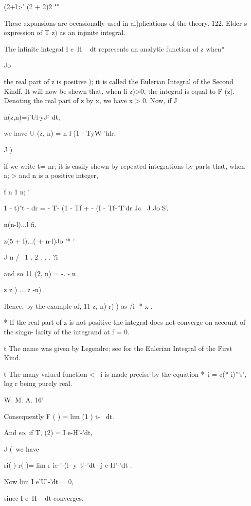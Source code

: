  (2+l>' (2 + 2)2 ""

These expansions are occasionally used in ai)plications of the theory.
122. Elder s expression of T z) as an injinite integral.

The infinite integral I e~H ~ dt represents an analytic function of z
when*

Jo

the real part of z is positive ); it is called the Eulerian
Integral of the Second Kindf. It will now be shewn that, when li z)>0,
the integral is equal to F (z). Denoting the real part of z by x, we
have x > 0. Now, if J

n(z,n)=j'Ul-yJ\'- dt,

we have U (z, n) = n l (1 - TyW-'hlr,

J )

if we write t= nr; it is easily shewn by repeated integrations by
parts that, when a; > and n is a positive integer,

f n 1 n; !

 1 - t)"t - dr = - T- (1 - Tf + - (I - Tf-'T'dr Jo \ J Jo S'.

n(n-l)...l fi,

z(5 + l)...( + n-l)Jo '* '

J n / \ 1 . 2 . . . ?i

and so 11 (2, n) = -. - n

z z ) ... z -n)

Hence, by the example of, 11 z, n) r( ) as /i -* x .

* If the real part of z is not positive the integral does not converge
on account of the singu- larity of the integrand at f = 0.

t The name was given by Legendre; see for the Eulerian
Integral of the First Kind.

t The many-valued function < ~i is made precise by the equation *~i =
c(*-i)'°s', log r being purely real.

W. M. A. 16'

%
%

Consequently F ( ) = lim (1 ) t-~ dt.

And so, if T, (2) = I e-H'-'dt,

J (\ we have

ri( )-r( )= lim r ie-'-(l- y\ t'-'dt+j e-H'-'dt .

Now lim I e'U'-'dt = 0,

since I e~H ~ dt converges.

